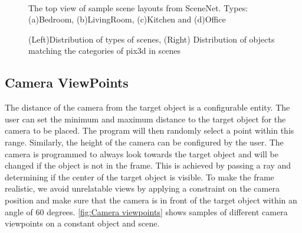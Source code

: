 \begin{figure}[!ht]
    \centering
    \quad
    \\
    \quad
    \caption{The top view of sample scene layouts from SceneNet. Types: (a)Bedroom, (b)LivingRoom, (c)Kitchen and (d)Office}
    \label{fig:Scene Types}
\end{figure}


\begin{figure}[!ht]
    \resizebox{0.49\textwidth}{6cm}{}
    \resizebox{0.49\textwidth}{6cm}{}
    \caption{(Left)Distribution of types of scenes, (Right) Distribution of objects matching the categories of pix3d in scenes}
    \label{fig:distribution of scenes}
\end{figure}


\subsection{Camera ViewPoints}\label{subsec:camera-viewpoints}

The distance of the camera from the target object is a configurable entity.
The user can set the minimum and maximum distance to the target object for the camera to be placed.
The program will then randomly select a point within this range.
Similarly, the height of the camera can be configured by the user.
The camera is programmed to always look towards the target object and will be changed if the object is not in the frame.
This is achieved by passing a ray and determining if the center of the target object is visible.
To make the frame realistic, we avoid unrelatable views by applying a constraint on the camera position and make sure that the camera is in front of the target object within an angle of 60 degrees.
\autoref{fig:Camera viewpoints} shows samples of different camera viewpoints on a constant object and scene.

